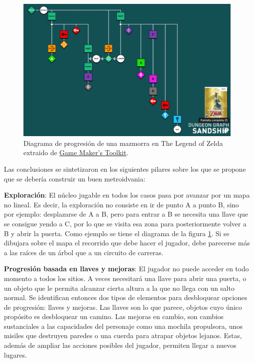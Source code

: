 \begin{figure}[h]
    \centering
    \includegraphics[scale=0.28]{img/mark-brown.png}
    \caption[Diagrama de progresión de una mazmorra en The Legend of Zelda]{Diagrama de progresión de una mazmorra en The Legend of Zelda extraido de \href{https://www.youtube.com/@GMTK}{Game Maker's Toolkit}.}
    \label{fig:markbrown}
\end{figure}

Las conclusiones se sintetizaron en los siguientes pilares sobre los que se propone que se debería construir un buen metroidvania:

\textbf{Exploración}: El núcleo jugable en todos los casos pasa por avanzar por un mapa no lineal. Es decir, la exploración no consiste en ir de punto A a punto B, sino por ejemplo: desplazarse de A a B, pero para entrar a B se necesita una llave que se consigue yendo a C, por lo que se visita esa zona para posteriormente volver a B y abrir la puerta. Como ejemplo se tiene el diagrama de la figura \ref{fig:markbrown}. Si se dibujara sobre el mapa el recorrido que debe hacer el jugador, debe parecerse más a las raíces de un árbol que a un circuito de carreras.


\textbf{Progresión basada en llaves y mejoras}: El jugador no puede acceder en todo momento a todos los sitios. A veces necesitará una llave para abrir una puerta, o un objeto que le permita alcanzar cierta altura a la que no llega con un salto normal. Se identifican entonces dos tipos de elementos para desbloquear opciones de progresión: llaves y mejoras. Las llaves son lo que parece, objetos cuyo único propósito es desbloquear un camino. Las mejoras en cambio, son cambios sustanciales a las capacidades del personaje como una mochila propulsora, unos misiles que destruyen paredes o una cuerda para atrapar objetos lejanos. Estas, además de ampliar las acciones posibles del jugador, permiten llegar a nuevos lugares.


